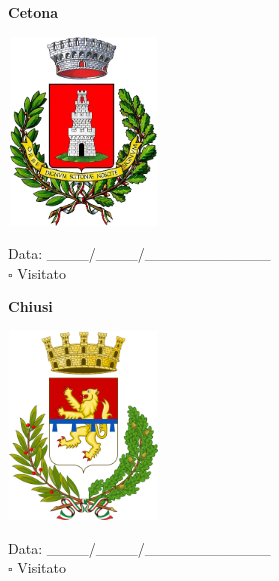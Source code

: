 \documentclass[a5paper,12pt]{article}
\begin{document}
\newpage

\noindent
\begin{minipage}[t]{0.45\textwidth}
    \begin{center}
        \textbf{Cetona}
    \end{center}
    \vspace{-0.5cm} %
    \begin{center}
        \includegraphics[height= 5cm, width=4cm]{Toscana/Stemma Cetona.png}
    \end{center}
    \vspace{-0.4cm} %
    \begin{flushleft}
        Data: \_\_\_\_/\_\_\_\_/\_\_\_\_\_\_\_\_\_\_\_\_ \\
        $\square$ Visitato
    \end{flushleft}
\end{minipage}
\hfill
\noindent
\begin{minipage}[t]{0.45\textwidth}
    \begin{center}
        \textbf{Chiusi}
    \end{center}
    \vspace{-0.5cm} %
    \begin{center}
        \includegraphics[height= 5cm, width=4cm]{Toscana/Stemma Chiusi.png}
    \end{center}
    \vspace{-0.4cm} %
    \begin{flushleft}
        Data: \_\_\_\_/\_\_\_\_/\_\_\_\_\_\_\_\_\_\_\_\_ \\
        $\square$ Visitato
    \end{flushleft}
\end{minipage}
\end{document}
